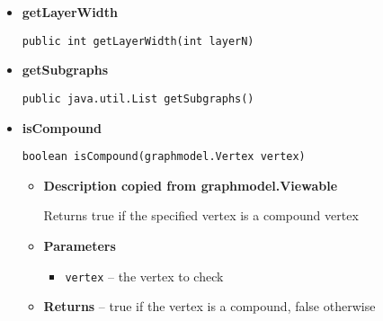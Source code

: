 {{{{\begin{itemize}
{\begin{itemize}
{Expands a collapsed vertex into its substituted set of vertices The vertices will be added back to the set of vertices of this graph. The compound vertex will be removed from the set of vertices. All to the compound vertex incident edges, will be resolved back into an edge between the vertices it connected before the collapse.
}
\item{
{\bf  Parameters}
  \begin{itemize}
   \item{
\texttt{vertex} -- the collapsed vertex to expand}
  \end{itemize}
}%
\item{{\bf  Returns} -- 
the set of vertices which was substituted by the collapsed vertex 
}%
\end{itemize}
}%
\item{ 
{\bf  getLayerWidth}\\
\begin{lstlisting}[frame=none]
public int getLayerWidth(int layerN)\end{lstlisting} %
}%
\item{ 
{\bf  getSubgraphs}\\
\begin{lstlisting}[frame=none]
public java.util.List getSubgraphs()\end{lstlisting} %
}%
\item{ 
{\bf  isCompound}\\
\begin{lstlisting}[frame=none]
boolean isCompound(graphmodel.Vertex vertex)\end{lstlisting} %
\begin{itemize}
\item{
{\bf  Description copied from graphmodel.Viewable{\small {}} }

Returns true if the specified vertex is a compound vertex
}
\item{
{\bf  Parameters}
  \begin{itemize}
   \item{
\texttt{vertex} -- the vertex to check}
  \end{itemize}
}%
\item{{\bf  Returns} -- 
true if the vertex is a compound, false otherwise 
}%
\end{itemize}
}%
\end{itemize}
}
}
}}

